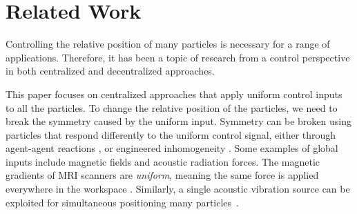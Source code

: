 
\section{Related Work}\label{sec:RelatedWork}

Controlling the relative position of many particles is necessary for a range of applications. Therefore, it has been a topic of research from a control perspective in both centralized and decentralized approaches. 

 This paper focuses on centralized approaches that apply uniform control inputs to all the particles. To change the relative position of the particles, we need to break the symmetry caused by the uniform input.
Symmetry can be broken using particles that respond differently to the uniform control signal, either through agent-agent reactions \cite{bertozzi2015ring}, or engineered inhomogeneity  \cite{Donald2013,bretl2007,beckerIJRR2014}. 
Some examples of global inputs include magnetic fields and acoustic radiation forces. The magnetic gradients of MRI scanners are \emph{uniform}, meaning the same force is applied everywhere in the workspace \cite{nosrati2018development}. Similarly, a single acoustic vibration source can be exploited for simultaneous positioning many particles~\cite{oberti2007manipulation,zhou2016controlling}. 

 

